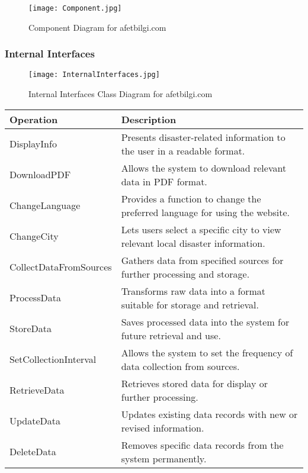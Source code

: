 \documentclass[12pt, letterpaper]{article}
\begin{document}
\begin{figure}[H]
\centering
\texttt{[image: Component.jpg]}
\caption{Component Diagram for afetbilgi.com}
\end{figure}

\subsubsection{Internal Interfaces}

\begin{figure}[H]
\centering
\texttt{[image: InternalInterfaces.jpg]}
\caption{Internal Interfaces Class Diagram for afetbilgi.com}
\end{figure}

\begin{table}[H]
    \centering
    \begin{tabular}{|l|p{10cm}|}
        \hline
        \textbf{Operation} & \textbf{Description} \\
        \hline 
        DisplayInfo & Presents disaster-related information to the user in a readable format. \\
        \hline
        DownloadPDF & Allows the system to download relevant data in PDF format. \\
        \hline
        ChangeLanguage & Provides a function to change the preferred language for using the website. \\
        \hline 
        ChangeCity & Lets users select a specific city to view relevant local disaster information. \\
        \hline
        CollectDataFromSources & Gathers data from specified sources for further processing and storage. \\
        \hline
        ProcessData & Transforms raw data into a format suitable for storage and retrieval. \\
        \hline 
        StoreData & Saves processed data into the system for future retrieval and use. \\
        \hline
        SetCollectionInterval & Allows the system to set the frequency of data collection from sources. \\
        \hline
        RetrieveData & Retrieves stored data for display or further processing. \\
        \hline
        UpdateData & Updates existing data records with new or revised information. \\
        \hline
        DeleteData & Removes specific data records from the system permanently. \\

\end{tabular}
\end{table}
\end{document}
